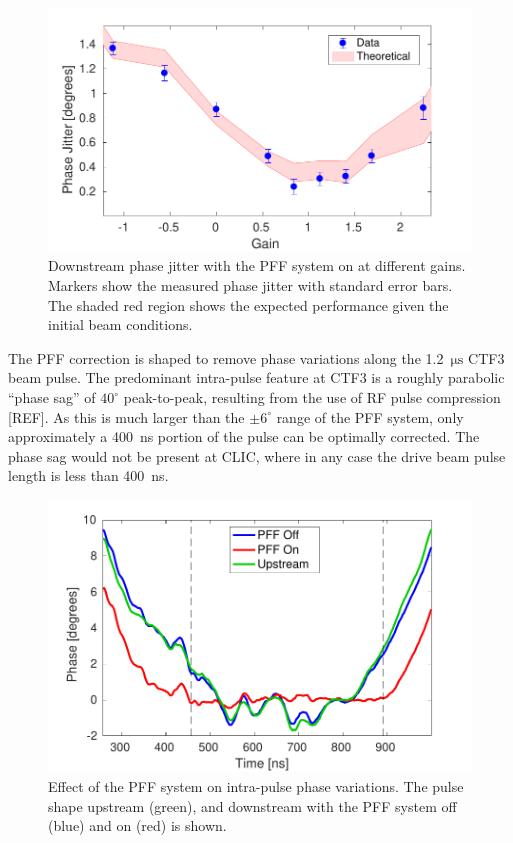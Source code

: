 \documentclass[%
 reprint,
superscriptaddress,
 amsmath,amssymb,
 prl,
]{revtex4-1}
\begin{document}
\begin{figure}
\includegraphics[width=\columnwidth]{figs/gScan}%
\caption{\label{fig:gScan}Downstream phase jitter with the PFF system on at 
different gains. Markers show the measured phase jitter with standard error 
bars. The shaded red region shows the expected performance given the initial 
beam conditions.}
\end{figure}

The PFF correction is shaped to remove phase variations along the 
1.2~\(\mathrm{\mu s}\) CTF3 beam pulse. The predominant intra-pulse feature at 
CTF3 is a roughly parabolic ``phase sag'' of \(40^\circ\) peak-to-peak, 
resulting from the use of RF pulse compression [REF]. As this is much larger 
than the 
\(\pm 6^\circ\) range of the PFF system, only approximately a 400~ns portion of 
the pulse can be optimally corrected. The phase sag would not be present at 
CLIC, where in any case the drive beam pulse length is less than 400~ns.

\begin{figure}
	\includegraphics[width=\columnwidth]{figs/shape}%
	\caption{\label{fig:shape}Effect of the PFF system on intra-pulse phase 
		variations. The pulse shape upstream (green), and downstream with the 
		PFF 
		system off (blue) and on (red) is shown.}
\end{figure}
\end{document}
